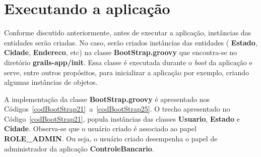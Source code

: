\section{Executando a aplicação}\label{secBootstrap2}

\vspace{0.3cm}

Conforme discutido anteriormente, antes  de executar a aplicação, instâncias das
entidades serão criadas.  No caso,  serão criados instâncias das entidades ({\bf
  Estado}, {\bf  Cidade}, {\bf Endereco}, etc) na  classe {\bf BootStrap.groovy}
que  encontra-se no  diretório {\bf  grails-app/init}. Essa  classe  é executada
durante  o  {\it boot}  da  aplicação e  serve,  entre  outros propósitos,  para
inicializar a aplicação por exemplo, criando algumas instâncias de objetos. 

\vspace{0.2cm}

A   implementação   da  classe   {\bf   BootStrap.groovy}   é  apresentado   nos
Códigos~\ref{codBootStrap21}~a~\ref{codBootStrap25}.   O  trecho apresentado  no
Código~\ref{codBootStrap21},  popula  instâncias   das  classes  {\bf  Usuario},
{\bf Estado}  e {\bf  Cidade}. Observa-se  que o usuário  criado é  associado ao
papel  {\bf  ROLE\_ADMIN}. Ou  seja,  o usuário  criado  desempenha  o papel  de
administrador da aplicação {\bf ControleBancario}.  


